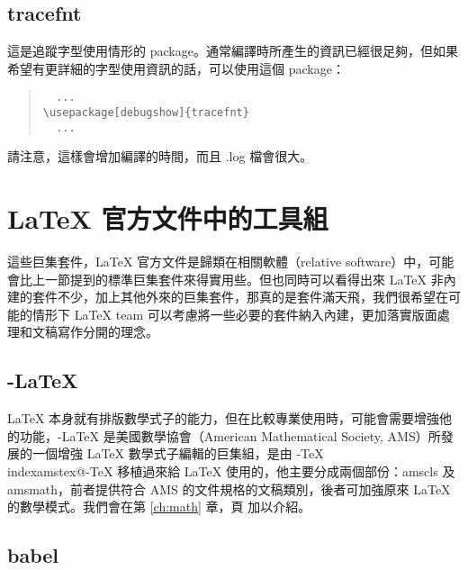 \subsection{tracefnt}

這是追蹤字型使用情形的 package。通常編譯時所產生的資訊已經很足夠，但如果希望有更詳細的字型使用資訊的話，可以使用這個 package：

\begin{quote}
  \begin{verbatim}
  ...
\usepackage[debugshow]{tracefnt}
  ...
\end{verbatim}
\end{quote}

請注意，這樣會增加編譯的時間，而且 {\ttfamily *.log} 檔會很大。

\section{\LaTeX{} 官方文件中的工具組}

這些巨集套件，\LaTeX{} 官方文件是歸類在相關軟體（relative software）中，可能會比上一節提到的標準巨集套件來得實用些。但也同時可以看得出來 \LaTeX{} 非內建的套件不少，加上其他外來的巨集套件，那真的是套件滿天飛，我們很希望在可能的情形下 \LaTeX{} team 可以考慮將一些必要的套件納入內建，更加落實版面處理和文稿寫作分開的理念。

\subsection{\AmS-\LaTeX}

\LaTeX{} 本身就有排版數學式子的能力，但在比較專業使用時，可能會需要增強他的功能，\AmS-\LaTeX{} 是美國數學協會（American Mathematical Society, AMS）所發展的一個增強 \LaTeX{} 數學式子編輯的巨集組，是由 \AmS-\TeX\\index{amstex@\AmS-\TeX} 移植過來給 \LaTeX{} 使用的，他主要分成兩個部份：\textsf{amscls} 及 \textsf{amsmath}，前者提供符合 AMS 的文件規格的文稿類別，後者可加強原來 \LaTeX{} 的數學模式。我們會在第 \ref{ch:math} 章，頁 \pageref{ch:math} 加以介紹。

\subsection{babel}

